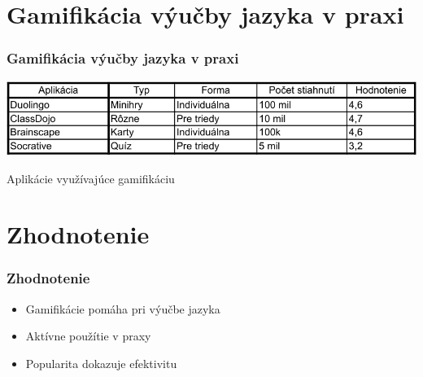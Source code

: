 \documentclass{beamer}
\begin{document}
\section{Gamifikácia výučby jazyka v praxi}

\begin{frame}[fragile=singleslide,plain]\frametitle{Gamifikácia výučby jazyka v praxi}
\begin{center}
\includegraphics[scale=.7]{aplikacie.pdf}

{\tiny Aplikácie využívajúce gamifikáciu}
\end{center}
\end{frame}



\section*{Zhodnotenie}

\begin{frame}[fragile=singleslide,plain]\frametitle{Zhodnotenie}
\begin{itemize}
\item Gamifikácie pomáha pri výučbe jazyka
\item Aktívne použítie v praxy
\item Popularita dokazuje efektivitu
\end{itemize}
\end{frame}
\end{document}
